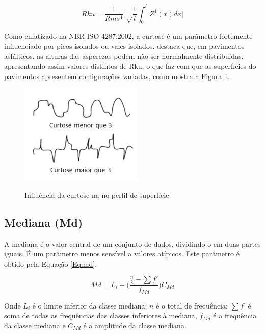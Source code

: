 \begin{equation}\label{Eq:rku}
%
Rku = \frac{1}{Rms^4} \bigg[\sqrt\frac{1}{l} \int_0^l Z^4(x)  dx \bigg] 
%
\end{equation}
%

Como enfatizado na NBR ISO 4287:2002\nocite{iso4287}, a curtose é um parâmetro fortemente influenciado por picos isolados ou vales isolados.  destaca que, em pavimentos asfálticos, as alturas das asperezas podem não ser normalmente distribuídas, apresentando assim valores distintos de Rku, o que faz com que as superfícies do pavimentos apresentem 
configurações variadas, como mostra a Figura \ref{Fig:curtose}.

\begin{figure}[!ht]
\centering
{\includegraphics[scale=1.1]{figures/curtose.jpg}}\\
\caption{Influência da curtose na no perfil de superfície.}  \label{Fig:curtose}
\end{figure}


\subsection{Mediana (Md)}
A mediana é o valor central de um conjunto de dados, dividindo-o em duas partes iguais. É um parâmetro menos sensível a valores atípicos. Este parâmetro é obtido pela Equação \ref{Eq:md}.

\begin{equation}\label{Eq:md}
%
Md = L_i+\bigg(\frac{\frac{n}{2}-\sum{f'}}{f_{Md}}\bigg) C_{Md}
%
\end{equation}
%

Onde $L_i$ é o limite inferior da classe mediana; $n$ é o total
de frequência; $\sum{f’}$ é soma de todas as frequências das classes inferiores à mediana, $f_{Md}$ é a frequência da classe mediana e $C_{Md}$ é a amplitude da classe mediana.


